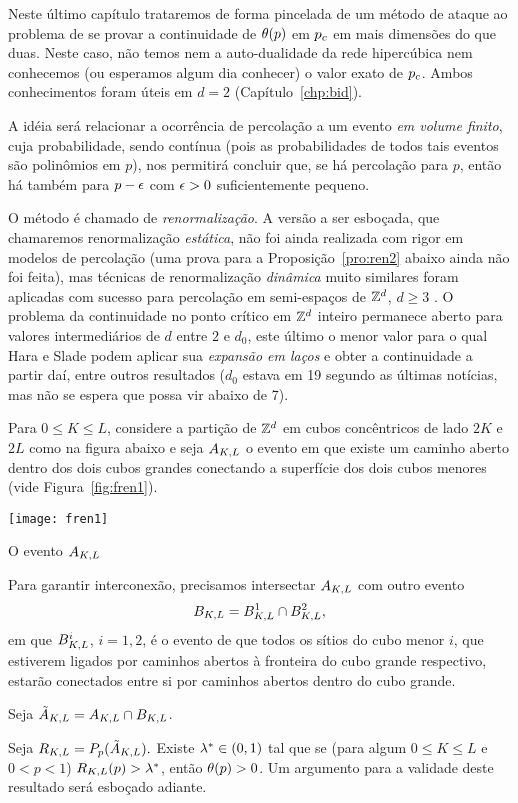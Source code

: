 Neste último capítulo trataremos de forma pincelada de um método de ataque
ao problema de se provar a continuidade de $\theta(p)$ em $p_c$ em mais dimensões
do que duas. Neste caso, não temos nem a auto-dualidade da rede
hipercúbica nem conhecemos (ou esperamos algum dia conhecer) o valor exato
de $p_c$. Ambos conhecimentos foram úteis em $d=2$ (Capítulo~\ref{chp:bid}).

A idéia será relacionar a ocorrência de percolação a um evento {\em em volume
finito}, cuja probabilidade, sendo contínua (pois as probabilidades de todos
tais eventos são polinômios em $p$), nos permitirá concluir que, se há 
percolação para $p$, então há também para $p-\epsilon$ com $\epsilon>0$ 
suficientemente pequeno.

O método é chamado de {\em renormalização}. A versão a ser esboçada, que chamaremos
renormalização {\em estática}, não foi ainda realizada com rigor em modelos
de percolação (uma prova para a Proposi\c cão~\ref{pro:ren2} abaixo
ainda não
foi feita), mas técnicas de renormalização {\em dinâmica} muito similares
foram aplicadas
com sucesso para percolação em semi-espaços de $\mathbb{Z}^d$, $d\geq3$ 
\cite{kn:BGN}. O problema da continuidade no ponto crítico
em $\mathbb{Z}^d$ inteiro permanece aberto para valores intermediários de $d$ entre
$2$ e $d_0$, este último o menor valor para o qual Hara e Slade \cite{kn:HS} podem
aplicar sua {\em expansão em laços} e obter a continuidade a partir daí, entre outros 
resultados ($d_0$ estava em 19 segundo as últimas notícias,
mas não se espera que possa vir abaixo de 7).

Para $0\leq K\leq L$, considere a partição de $\mathbb{Z}^d$ em cubos concêntricos 
de lado $2K$ e $2L$ como na figura abaixo e seja $A_{K,L}$ o evento em que
existe um caminho aberto dentro dos dois cubos grandes conectando a superfície
dos dois cubos menores (vide Figura~\ref{fig:fren1}).

\bef
%
\texttt{[image: fren1]}
\caption{O evento $A_{K,L}$}
\label{fig:fren1}
\eef

Para garantir interconexão, precisamos intersectar $A_{K,L}$ com outro e\-ven\-to
$$B_{K,L}=B_{K,L}^1\cap B_{K,L}^2,$$
em que $B_{K,L}^i$, $i=1,2$, é o evento de que todos os sítios do cubo menor $i$, que
estiverem ligados por caminhos abertos à fronteira do cubo grande respectivo,
estarão conectados entre si por caminhos abertos dentro do cubo grande.

Seja $\tilde A_{K,L}=A_{K,L}\cap B_{K,L}$.

\vs

\bpro
\label{pro:ren1}
Seja $R_{K,L}=P_p(\tilde A_{K,L}).$ Existe $\lambda^\ast\in(0,1)$ tal que se (para algum $0\leq
K\leq L$ e $0<p<1$) $R_{K,L}(p)>\lambda^\ast$, então $\theta(p)>0$.
\epro
Um argumento para a validade deste resultado será esboçado adiante.

